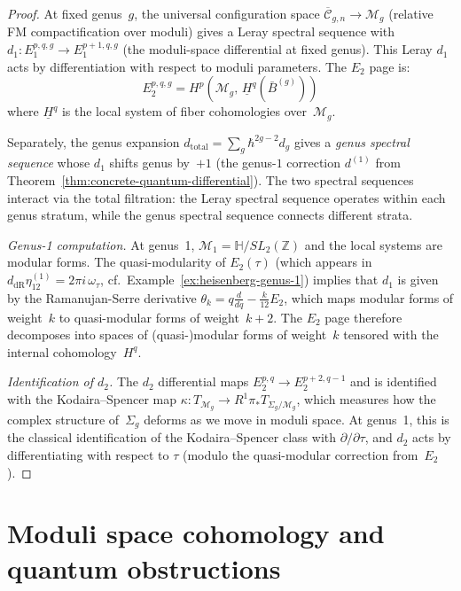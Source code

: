 \begin{proof}
At fixed genus~$g$, the universal configuration space
$\overline{\mathcal{C}}_{g,n} \to \mathcal{M}_g$ (relative FM
compactification over moduli) gives a Leray spectral sequence
with $d_1: E_1^{p,q,g} \to E_1^{p+1,q,g}$ (the moduli-space differential
at fixed genus).  This Leray $d_1$ acts by differentiation with respect
to moduli parameters.  The $E_2$ page is:
\[
E_2^{p,q,g} = H^p(\mathcal{M}_g,\, \underline{H}^q(\bar{B}^{(g)}))
\]
where $\underline{H}^q$ is the local system of fiber cohomologies
over~$\mathcal{M}_g$.

Separately, the genus expansion $d_{\mathrm{total}} = \sum_g \hbar^{2g-2} d_g$
gives a \emph{genus spectral sequence} whose $d_1$ shifts genus by~$+1$
(the genus-$1$ correction $d^{(1)}$ from
Theorem~\ref{thm:concrete-quantum-differential}).  The two spectral
sequences interact via the total filtration: the Leray spectral
sequence operates within each genus stratum, while the genus spectral
sequence connects different strata.

\emph{Genus-1 computation.}
At genus~1, $\mathcal{M}_1 = \mathbb{H}/SL_2(\mathbb{Z})$ and the local systems are modular forms.  The quasi-modularity of $E_2(\tau)$ (which appears in $d_{\mathrm{dR}}\eta_{12}^{(1)} = 2\pi i\, \omega_\tau$, cf.\ Example~\ref{ex:heisenberg-genus-1}) implies that $d_1$ is given by the Ramanujan-Serre derivative $\theta_k = q\frac{d}{dq} - \frac{k}{12}E_2$, which maps modular forms of weight~$k$ to quasi-modular forms of weight~$k+2$.  The $E_2$ page therefore decomposes into spaces of (quasi-)modular forms of weight~$k$ tensored with the internal cohomology~$H^q$.

\emph{Identification of $d_2$.}
The $d_2$ differential maps $E_2^{p,q} \to E_2^{p+2,q-1}$ and is identified with the Kodaira--Spencer map $\kappa: T_{\mathcal{M}_g} \to R^1\pi_* T_{\Sigma_g/\mathcal{M}_g}$, which measures how the complex structure of~$\Sigma_g$ deforms as we move in moduli space.  At genus~1, this is the classical identification of the Kodaira--Spencer class with $\partial/\partial\tau$, and $d_2$ acts by differentiating with respect to $\tau$ (modulo the quasi-modular correction from~$E_2$).
\end{proof}



\section{Moduli space cohomology and quantum obstructions}
\label{sec:moduli-cohomology-quantum}

